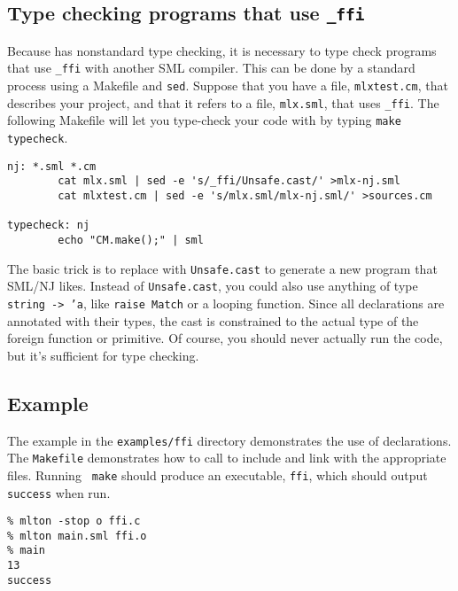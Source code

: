 \subsection{Type checking programs that use {\tt \_ffi}}

Because {\mlton} has nonstandard type checking, it is necessary to
type check programs that use {\tt \_ffi} with another SML compiler.
This can be done by a standard process using a Makefile and {\tt sed}.
Suppose that you have a file, {\tt mlxtest.cm}, that describes your
{\mlton} project, and that it refers to a file, {\tt mlx.sml}, that
uses {\tt \_ffi}.  The following Makefile will let you type-check your
code with {\smlnj} by typing {\tt make typecheck}.

\begin{verbatim}
nj: *.sml *.cm
        cat mlx.sml | sed -e 's/_ffi/Unsafe.cast/' >mlx-nj.sml
        cat mlxtest.cm | sed -e 's/mlx.sml/mlx-nj.sml/' >sources.cm

typecheck: nj
        echo "CM.make();" | sml
\end{verbatim}

The basic trick is to replace {\ffi} with {\tt Unsafe.cast} to generate a new
program that SML/NJ likes.  Instead of {\tt Unsafe.cast}, you could also use
anything of type {\tt string -> 'a}, like {\tt raise Match} or a looping
function.  Since all {\ffi} declarations are annotated with their types, the
cast is constrained to the actual type of the foreign function or primitive. Of
course, you should never actually run the code, but it's sufficient for type
checking.

\subsection{Example}

The example in the {\tt examples/ffi} directory demonstrates the use of
{\ffi} declarations.  The {\tt Makefile} demonstrates how
to call {\mlton} to include and link with the appropriate files.  Running {\tt
make} should produce an executable, {\tt ffi}, which should output {\tt success}
when run.

\begin{verbatim}
% mlton -stop o ffi.c
% mlton main.sml ffi.o
% main
13
success
\end{verbatim}
